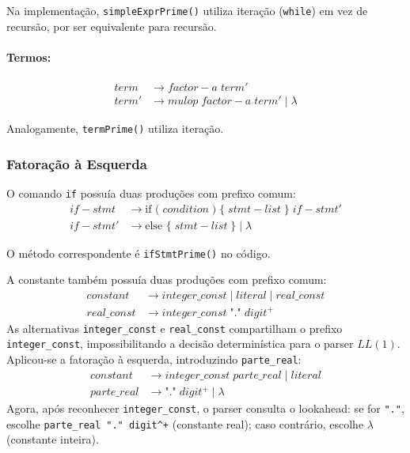 \documentclass[12pt,a4paper]{article}
\begin{document}
Na implementação, \texttt{simpleExprPrime()} utiliza iteração (\texttt{while}) em vez de recursão, por
ser equivalente para recursão.

\paragraph{Termos:}
\begin{align*}
term    &\to factor\!-\!a \; term' \\
term'   &\to mulop \; factor\!-\!a \; term' \mid \lambda
\end{align*}

Analogamente, \texttt{termPrime()} utiliza iteração.

\subsubsection{Fatoração à Esquerda}

O comando \texttt{if} possuía duas produções com prefixo comum:
\begin{align*}
if\!-\!stmt     &\to \text{if } \text{(} \; condition \; \text{)} \; \text{\{} \; stmt\!-\!list \; \text{\}} \; if\!-\!stmt' \\
if\!-\!stmt'    &\to \text{else } \text{\{} \; stmt\!-\!list \; \text{\}} \mid \lambda
\end{align*}

O método correspondente é \texttt{ifStmtPrime()} no código.

A constante também possuía duas produções com prefixo comum:
\begin{align*}
constant        &\to integer\_const \mid literal \mid real\_const \\
real\_const     &\to integer\_const \; \text{"."} \; digit^{+}
\end{align*}
As alternativas \texttt{integer\_const} e \texttt{real\_const} compartilham o prefixo \texttt{integer\_const}, impossibilitando a decisão determinística para o parser $LL(1)$. Aplicou-se a fatoração à esquerda, introduzindo \texttt{parte\_real}:
\begin{align*}
constant        &\to integer\_const \; parte\_real \mid literal \\
parte\_real     &\to \text{"."} \; digit^{+} \mid \lambda
\end{align*}
Agora, após reconhecer \texttt{integer\_const}, o parser consulta o lookahead: se for \texttt{"."}, escolhe \texttt{parte\_real \to "." digit^{+}} (constante real); caso contrário, escolhe $\lambda$ (constante inteira).
\end{document}
